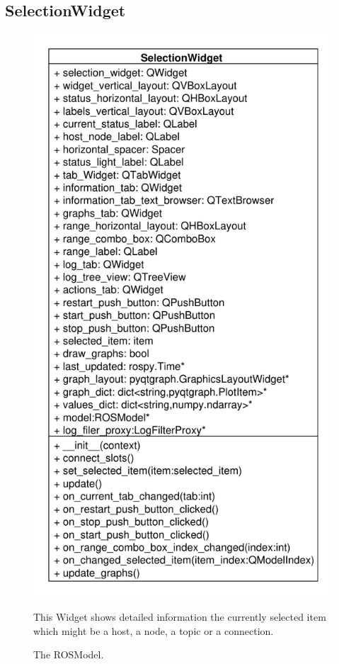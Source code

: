 \newpage
\subsection{SelectionWidget}
\begin{figure}[htbp]
	\begin{minipage}[t]{7cm}
		\vspace{0pt}
		\centering
		\includegraphics[scale=0.6]{./diagram_pictures/Selection.pdf}
		\caption{The ROSModel.}
	\end{minipage}
	\hfill
	\begin{minipage}[t]{6.5cm}
		\vspace{10pt}
		This Widget shows detailed information the currently selected item which might be a host, a node, a topic or a connection.
	\end{minipage}
\end{figure} 
